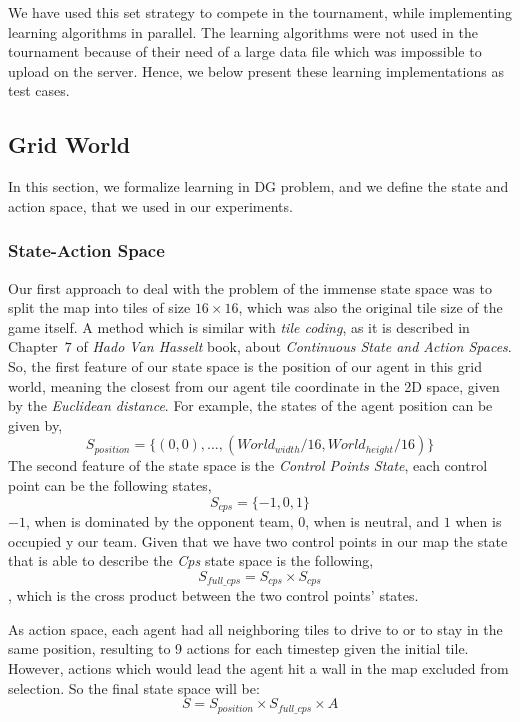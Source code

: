 \documentclass[conference]{IEEEtran}
\begin{document}
We have used this set strategy to compete in the tournament, while implementing learning algorithms in parallel. The learning algorithms were not used in the tournament because of their need of a large data file which was impossible to upload on the server. Hence, we below present these learning implementations as test cases.


\subsection{Grid World}
In this section, we formalize learning in DG problem, and we define the state and action space, that we used in our experiments.
\subsubsection{State-Action Space}
Our first approach to deal with the problem of the immense state space was to split the map into tiles of size $16\times16$, which was also the original tile size of the game itself. A method which is similar with \textit{tile coding}, as it is described in Chapter~$7$ of \emph{Hado Van Hasselt} book, about \textit{Continuous State and Action Spaces}. So, the first feature of our state space is the position of our agent in this grid world, meaning the closest from our agent tile coordinate in the 2D space, given by the \textit{Euclidean distance}. For example, the states of the agent position can be given by, 
\begin{equation}
S_{position} = \lbrace (0,0),\ldots,(World_{width} / 16, World_{height} / 16)  \rbrace
\end{equation} 
The second feature of the state space is the \textit{Control Points State}, each control point can be the following states,
\begin{equation}
S_{cps} = \lbrace -1, 0, 1 \rbrace
\end{equation}
$-1$, when is dominated by the opponent team, $0$, when is neutral, and $1$ when is occupied y our team. Given that we have two control points in our map the state that is able to describe the \textit{Cps} state space is the following, 
\begin{equation}
S_{full\_cps} = S_{cps} \times S_{cps} 
\end{equation}
, which is the cross product between the two control points' states. 

As action space, each agent had all neighboring tiles to drive to or to stay in the same position, resulting to 9 actions for each timestep given the initial tile. However, actions which would lead the agent hit a wall in the map excluded from selection. So the final state space will be:
\begin{equation}
S = S_{position} \times S_{full\_cps} \times A
\end{equation}
\end{document}
